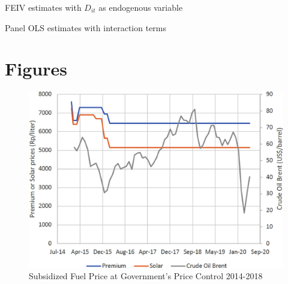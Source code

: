 \documentclass[letterpaper,12pt,leqno]{article}
\begin{document}
\begin{table}[h]
\caption{FEIV estimates with $D_{it}$ as endogenous variable}
\scalebox{0.8}{}    
\label{t:FEIV2}\end{table}


\begin{table}[h]
\caption{Panel OLS estimates with interaction terms} 
\scalebox{0.85}{}
\label{t:pols2}\end{table}


\section{Figures}

\begin{figure}[h]
\includegraphics[scale=0.7]{Final_Project/image/bbm-price-2014-2018.jpg}
\caption{Subsidized Fuel Price at Government's Price Control 2014-2018}
\label{f:1}
\end{figure}
\end{document}

